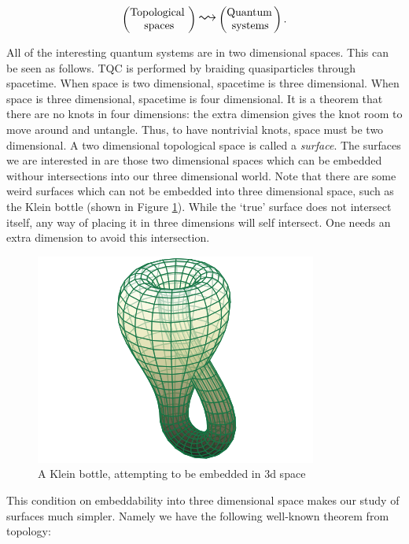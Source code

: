 \documentclass{article}
\theoremstyle{definition}
\numberwithin{figure}{section}
\begin{document}
$$
\begin{pmatrix}
\text{Topological } \\
\text{spaces}
\end{pmatrix}
\bigleadsto
\begin{pmatrix}
\text{Quantum\,} \\ \text{systems}
\end{pmatrix}.
$$

All of the interesting quantum systems are in two dimensional spaces. This can be seen as follows. TQC is performed by braiding quasiparticles through spacetime. When space is two dimensional, spacetime is three dimensional. When space is three dimensional, spacetime is four dimensional. It is a theorem that there are no knots in four dimensions: the extra dimension gives the knot room to move around and untangle. Thus, to have nontrivial knots, space must be two dimensional. A two dimensional topological space is called a \textit{surface}. The surfaces we are interested in are those two dimensional spaces which can be embedded withour intersections into our three dimensional world. Note that there are some weird surfaces which can not be embedded into three dimensional space, such as the Klein bottle (shown in Figure \ref{fig:klein-bottle}). While the `true' surface does not intersect itself, any way of placing it in three dimensions will self intersect. One needs an extra dimension to avoid this intersection.

\begin{figure}
\begin{center}
\includegraphics[scale=0.25]{klein-bottle}
\caption{A Klein bottle, attempting to be embedded in 3d space}
\label{fig:klein-bottle}
\end{center}
\end{figure}

This condition on embeddability into three dimensional space makes our study of surfaces much simpler. Namely we have the following well-known theorem from topology:
\end{document}

